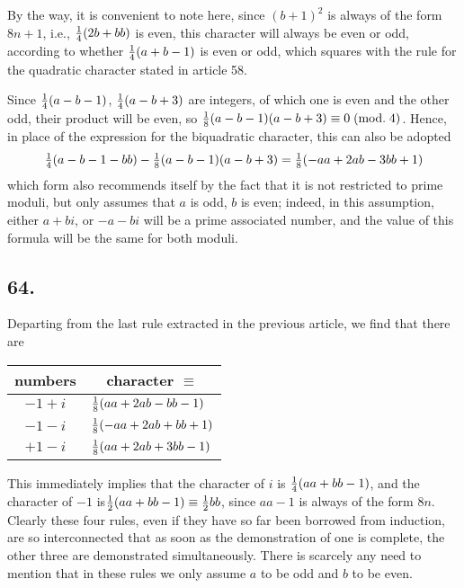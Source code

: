 \documentclass[twoside,12pt, showframe]{memoir}
\renewcommand{\pmod}[1]{\;(\textrm{mod.}\;#1)}
\let\oldfrac\frac
\def\frac#1#2{\mathchoice{\tfrac{#1}{#2}}{\oldfrac{#1}{#2}}{\genfrac{}{}{}{2}{#1}{#2\mathstrut}}{\genfrac{}{}{}{3}{#1}{#2\mathstrut}}}
\begin{document}
By the way, it is convenient to note here, since \((b+1)^{2}\) is always of the form \(8 n+1\), i.e., \(\frac{1}{4}(2 b+b b)\) is even, this character will always be even or odd, according to whether \(\frac{1}{4}(a+b-1)\) is even or odd, which squares with the rule for the quadratic character stated in article 58.

Since \(\frac{1}{4}(a-b-1)\), \( \frac{1}{4}(a-b+3)\) are integers, of which one is even and the other odd, their product will be even, so \(\frac{1}{8}(a-b-1)(a-b+3) \equiv 0\pmod{4}\). Hence, in place of the expression for the biquadratic character, this can also be adopted
\[\frac{1}{4}(a-b-1-b b)-\frac{1}{8}(a-b-1)(a-b+3)=\frac{1}{8}(-a a+2 a b-3 b b+1)\]
which form also recommends itself by the fact that it is not restricted to prime moduli, but only assumes that \(a\) is odd, \(b\) is even; indeed, in this assumption, either \(a+b i\), or \(-a-b i\) will be a prime associated number, and the value of this formula will be the same for both moduli.\\
%

\subsection*{64.}

Departing from the last rule extracted in the previous article, we find that there are
\begin{center}
\begin{tabular}{c|l}
numbers & \multicolumn{1}{c}{character \(\equiv\)} \\
\hline
\(-1+i\) & \(\frac{1}{8}(a a+2 a b-b b-1)\) \\
\(-1-i\) & \(\frac{1}{8}(-a a+2 a b+b b+1)\) \\
\(+1-i\) & \(\frac{1}{8}(a a+2 a b+3 b b-1)\) \\
\end{tabular}
\end{center}
This immediately implies that the character of \(i\) is \(\frac{1}{4}(a a+b b-1)\), and the character of \(-1\) is\(\frac{1}{2}(a a+b b-1) \equiv \frac{1}{2} b b\), since \(a a-1\) is always of the form \(8n\). Clearly these four rules, even if they have so far been borrowed from induction, are so interconnected that as soon as the demonstration of one is complete, the other three are demonstrated simultaneously. There is scarcely any need to mention that in these rules we only assume \(a\) to be odd and \(b\) to be even.
%
\end{document}

